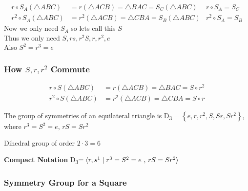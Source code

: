 \begin{align*}
    r \circ S_A(\triangle ABC) &=r(\triangle ACB)=\triangle BAC =S_C(\triangle ABC) & r \circ S_A = S_C\\
    r^2 \circ S_A(\triangle ABC) &=r^2(\triangle ACB)=\triangle CBA = S_B(\triangle ABC) & r^2 \circ S_A = S_B
\end{align*}
Now we only need \(S_A\) so lets call this \(S\)\\
Thus we only need \(S,rs,r^2S,r,r^2,e\)\\
Also \(S^2=r^3=e\)

\subsubsection*{How \(S,r,r^2\) Commute}
\begin{align*}
    r \circ S(\triangle ABC) &=r(\triangle ACB) =\triangle BAC = S\circ r^2\\
    r^2 \circ S(\triangle ABC) &=r^2(\triangle ACB)=\triangle CBA = S \circ r
\end{align*}

\begin{definition}
    The group of symmetries of an equilateral triangle is D\textsubscript{3}\(=\left\{ e,r,r^2,S,Sr,Sr^2 \right\}\), where  \(r^3=S^2=e\), \(rS=Sr^2\)

    Dihedral group of order \(2\cdot3=6\)

    \textbf{\large Compact Notation} \large D\textsubscript{3}\(=\langle r,s\footnotemark \mid  r^3=S^2=e \t{ , } rS=Sr^2 \rangle\)
\end{definition}

\newpage
\subsubsection{Symmetry Group for a Square}

